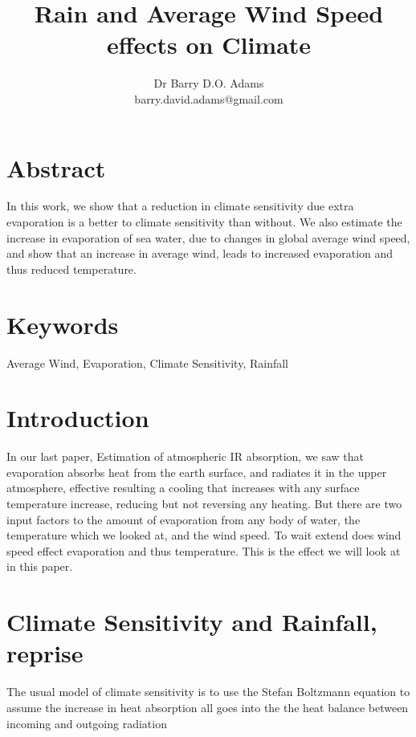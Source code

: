 \documentclass{book}
\begin{document}
	\title{Rain and Average Wind Speed effects on Climate}
	\author{Dr Barry D.O. Adams \\ barry.david.adams@gmail.com}
	\maketitle
	\section{Abstract}
		In this work, we show that a reduction in climate sensitivity due extra evaporation is a better to climate sensitivity than without. We also estimate the increase in evaporation of sea water, due to changes in global average wind speed, and show	that an increase in average wind, leads to increased evaporation and thus reduced temperature.
		
	\section{Keywords} Average Wind, Evaporation, Climate Sensitivity, Rainfall
	
	\section{Introduction}
		In our last paper, Estimation of atmospheric IR absorption, we saw that evaporation absorbs heat from the earth surface, and radiates it in the upper atmosphere,
		effective resulting a cooling that increases with any surface temperature increase, reducing but not reversing any heating. But there are two input factors to the
		amount of evaporation from any body of water, the temperature which we looked at, and the wind speed. To wait extend does wind speed effect evaporation and thus
		temperature. This is the effect we will look at in this paper. 
		
	\section{Climate Sensitivity and Rainfall, reprise}
	
	The usual model of climate sensitivity is to use the Stefan Boltzmann equation to assume the increase in heat absorption all goes into the the heat balance between incoming and outgoing radiation \cite{wikisense}
	
\end{document}
